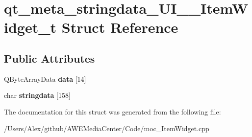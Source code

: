 \hypertarget{structqt__meta__stringdata___u_i_____item_widget__t}{\section{qt\-\_\-meta\-\_\-stringdata\-\_\-\-U\-I\-\_\-\-\_\-\-Item\-Widget\-\_\-t Struct Reference}
\label{structqt__meta__stringdata___u_i_____item_widget__t}
}
\subsection*{Public Attributes}
\begin{DoxyCompactItemize}
\item 
\hypertarget{structqt__meta__stringdata___u_i_____item_widget__t_a5b385109a1e9e70d12196a056252b5bf}{Q\-Byte\-Array\-Data {\bfseries data} \mbox{[}14\mbox{]}}\label{structqt__meta__stringdata___u_i_____item_widget__t_a5b385109a1e9e70d12196a056252b5bf}

\item 
\hypertarget{structqt__meta__stringdata___u_i_____item_widget__t_a0e82054c436d9eded51134aa2da604ab}{char {\bfseries stringdata} \mbox{[}158\mbox{]}}\label{structqt__meta__stringdata___u_i_____item_widget__t_a0e82054c436d9eded51134aa2da604ab}

\end{DoxyCompactItemize}


The documentation for this struct was generated from the following file\-:\begin{DoxyCompactItemize}
\item 
/\-Users/\-Alex/github/\-A\-W\-E\-Media\-Center/\-Code/moc\-\_\-\-Item\-Widget.\-cpp\end{DoxyCompactItemize}

